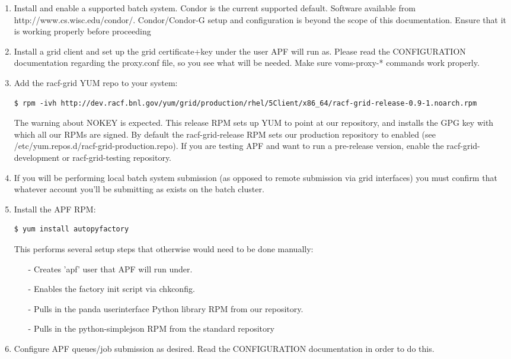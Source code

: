 \documentclass[a4paper]{jpconf}
\begin{document}
\begin{enumerate}
\item Install and enable a supported batch system. 
Condor is the current supported default. 
Software available from http://www.cs.wisc.edu/condor/.
Condor/Condor-G setup and configuration is beyond the scope of this documentation. Ensure that it is working properly before proceeding
\item Install a grid client and set up the grid certificate+key under the user APF will run as. 
Please read the CONFIGURATION documentation regarding the proxy.conf file, so you see what will be needed. 
Make sure voms-proxy-* commands work properly.
\item Add the racf-grid YUM repo to your system:
\begin{verbatim}
$ rpm -ivh http://dev.racf.bnl.gov/yum/grid/production/rhel/5Client/x86_64/racf-grid-release-0.9-1.noarch.rpm
\end{verbatim}
The warning about NOKEY is expected. 
This release RPM sets up YUM to point at our repository, 
and installs the GPG key with which all our RPMs are signed. 
By default the racf-grid-release RPM sets our production repository to enabled 
(see /etc/yum.repos.d/racf-grid-production.repo). 
If you are testing APF and want to run a pre-release version, enable the racf-grid-development or racf-grid-testing repository.
\item If you will be performing local batch system submission 
(as opposed to remote submission via grid interfaces) 
you must confirm that whatever account you'll be submitting as exists on the batch cluster.
\item Install the APF RPM:
\begin{verbatim}
$ yum install autopyfactory
\end{verbatim}
This performs several setup steps that otherwise would need to be done manually:
\begin{enumerate}
\item[-] Creates 'apf' user that APF will run under. 
\item[-] Enables the factory init script via chkconfig. 
\item[-] Pulls in the panda userinterface Python library RPM from our repository. 
\item[-] Pulls in the python-simplejson RPM from the standard repository
\end{enumerate}
\item Configure APF queues/job submission as desired. 
Read the CONFIGURATION documentation in order to do this. 

\end{enumerate}
\end{document}
